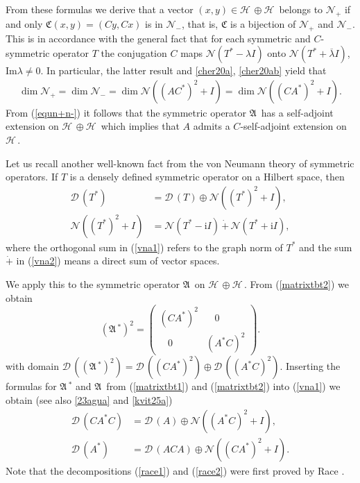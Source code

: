 \documentclass[12pt]{amsart}
\newcommand{\ii}{\mathrm{i}}
\theoremstyle{definition}
\newcommand{\gA}{\mathfrak{A}\,}
\newcommand{\cD}{\mathcal{D}\,}
\newcommand{\cH}{\mathcal{H}\,}
\newcommand{\I}{\mathrm{Im}}
\newcommand{\cN}{\mathcal{N}}
\newcommand{\gC}{\mathfrak{C}}
\begin{document}
From these formulas we derive that a vector $(x,y)\in \cH\oplus \cH$ belongs to $\cN_+$ if and only $\gC(x,y)=(Cy,Cx)$ is in $\cN_-$, that is, $\gC$ is a bijection of $\cN_+$ and $\cN_-.$ This is in accordance with the general fact that for each symmetric and $C$-symmetric operator $T$ the conjugation $C$ maps
$\cN(T^*-\lambda I)$ onto $\cN(T^*+\overline{\lambda} I)$, $\I \lambda \neq 0$. In particular, the latter result and \eqref{cher20a}, \eqref{cher20ab} yield  that
\begin{align}\label{equn+n-}\dim \cN_+=\dim \cN_-=\dim \cN((AC^*)^2+I)=\dim\cN((CA^*)^2+I).
\end{align}
From (\ref{equn+n-}) it follows that the symmetric operator $\gA$ has a self-adjoint extension on $\cH\oplus\cH$ which implies that $A$ admits a $C$-self-adjoint extension on $\cH$.

Let us recall another well-known fact from the von Neumann theory of symmetric operators. If $T$ is a densely defined symmetric operator on a Hilbert space, then
\begin{align}
\cD(T^*)&=\cD(T)\oplus \cN((T^*)^2+I),\label{vna1} \\ \cN((T^*)^2+I)&=\cN(T^*-\ii I)\, \dot{+}\, \cN(T^*+\ii I),\label{vna2}
\end{align}
where the orthogonal sum in (\ref{vna1})  refers to the graph norm of $T^*$ and the sum $\dot{+}$ in (\ref{vna2}) means a direct sum of vector spaces.

We apply this to the symmetric operator $\gA$ on $\cH\oplus\cH$. From (\ref{matrixtbt2}) we obtain
\[ %
(\gA^*)^2=\left(
\begin{array}{ll}
  (CA^*)^2 & ~~~~0 \\
~~~~ 0 &(A^*C)^2
\end{array}\right).
\]%
with domain $\cD((\gA^*)^2)=\cD((CA^*)^2)\oplus \cD((A^*C)^2)$. Inserting the formulas for $\gA^*$ and $\gA$ from (\ref{matrixtbt1}) and (\ref{matrixtbt2}) into (\ref{vna1}) we obtain (see also \eqref{23agua} and \eqref{kvit25a})
\begin{align} \cD(CA^*C)&=\cD(A)\oplus \cN((A^*C)^2+I),\label{race1} \\ \cD(A^*)&= \cD(ACA)\oplus \cN((CA^*)^2+I).\label{race2}
\end{align}
Note that the decompositions (\ref{race1}) and (\ref{race2}) were first proved by Race \cite{race}.
\end{document}
